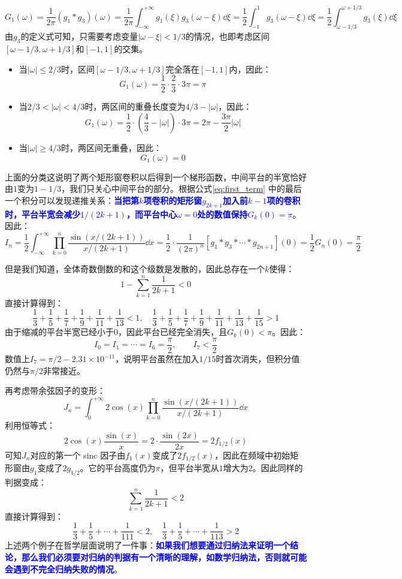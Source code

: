 \begin{equation}\label{eq:first_term}
G_1(\omega)=\frac{1}{2\pi}(g_1\ast g_3)(\omega)=\frac{1}{2\pi}\int_{-\infty}^{+\infty}g_1(\xi)g_3(\omega-\xi)\dd{\xi}=\frac{1}{2}\int_{-1}^{1}g_3(\omega-\xi)\dd{\xi}=\frac{1}{2}\int_{\omega-1/3}^{\omega+1/3}g_3(\xi)\dd{\xi}
\end{equation}
由$g_3$的定义式可知，只需要考虑变量$|\omega-\xi|<1/3$的情况，也即考虑区间$[\omega-1/3,\omega+1/3]$和$[-1,1]$的交集。
\begin{itemize}
\item 当$|\omega|\leqslant 2/3$时，区间$[\omega-1/3,\omega+1/3]$完全落在$[-1,1]$内，因此：
\[G_1(\omega)=\frac{1}{2}\cdot\frac{2}{3}\cdot3\pi=\pi\]
\item 当$2/3<|\omega|<4/3$时，两区间的重叠长度变为$4/3-|\omega|$，因此：
\[G_1(\omega)=\frac{1}{2}\cdot\left(\frac{4}{3}-|\omega|\right)\cdot3\pi=2\pi-\frac{3\pi}{2}|\omega|\]
\item 当$|\omega|\geqslant 4/3$时，两区间无重叠，因此：
\[G_1(\omega)=0\]
\end{itemize}
上面的分类这说明了两个矩形窗卷积以后得到一个梯形函数，中间平台的半宽恰好由$1$变为$1-1/3$，我们只关心中间平台的部分。根据公式\eqref{eq:first_term} 中的最后一个积分可以发现递推关系：\textcolor{blue}{\textbf{当把第$k$项卷积的矩形窗$g_{2k+1}$加入前$k-1$项的卷积时，平台半宽会减少$1/(2k+1)$，而平台中心$\omega=0$处的数值保持$G_k(0)=\pi$}}。因此：
\[I_n=\frac{1}{2}\int_{-\infty}^{+\infty}\prod_{k=0}^{n}\frac{\sin\left(x/(2k+1)\right)}{x/(2k+1)}\dd{x}=\frac{1}{2}\cdot\frac{1}{(2\pi)^n}[g_1 \ast g_{3} \ast \cdots \ast g_{2n+1}](0)=\frac{1}{2}G_n(0)=\frac{\pi}{2}\]

但是我们知道，全体奇数倒数的和这个级数是发散的，因此总存在一个$k$使得：
\[1-\sum_{k=1}^{n}\frac{1}{2k+1}<0\]
直接计算得到：
\[\frac{1}{3}+\frac{1}{5}+\frac{1}{7}+\frac{1}{9}+\frac{1}{11}+\frac{1}{13}<1,\quad \frac{1}{3}+\frac{1}{5}+\frac{1}{7}+\frac{1}{9}+\frac{1}{11}+\frac{1}{13}+\frac{1}{15}>1\]
由于缩减的平台半宽已经小于$0$，因此平台已经完全消失，且$G_k(0)<\pi$。因此：
\[I_0=I_1=\cdots=I_6=\frac{\pi}{2}, \qquad I_7<\frac{\pi}{2}\]
数值上$I_7=\pi/2-2.31\times 10^{-11}$，说明平台虽然在加入$1/15$时首次消失，但积分值仍然与$\pi/2$非常接近。

再考虑带余弦因子的变形：
\[J_n=\int_0^{+\infty}2\cos(x)\prod_{k=0}^{n}\frac{\sin\left(x/(2k+1)\right)}{x/(2k+1)}\dd x\]
利用恒等式：
\[2\cos(x)\frac{\sin(x)}{x}=2\cdot\frac{\sin(2x)}{2x}=2f_{1/2}(x)\]
可知$J_n$对应的第一个 sinc 因子由$f_1(x)$变成了$2f_{1/2}(x)$，因此在频域中初始矩形窗由$g_1$变成了$2g_{1/2}$。它的平台高度仍为$\pi$，但平台半宽从$1$增大为$2$。因此同样的判据变成：
\[\sum_{k=1}^{n}\frac{1}{2k+1}<2\]
直接计算得到：
\[\frac{1}{3}+\frac{1}{5}+\cdots+\frac{1}{111}<2,\quad \frac{1}{3}+\frac{1}{5}+\cdots+\frac{1}{113}>2\]
上述两个例子在哲学层面说明了一件事：\textcolor{blue}{\textbf{如果我们想要通过归纳法来证明一个结论，那么我们必须要对归纳的判据有一个清晰的理解，如数学归纳法，否则就可能会遇到不完全归纳失败的情况}}。